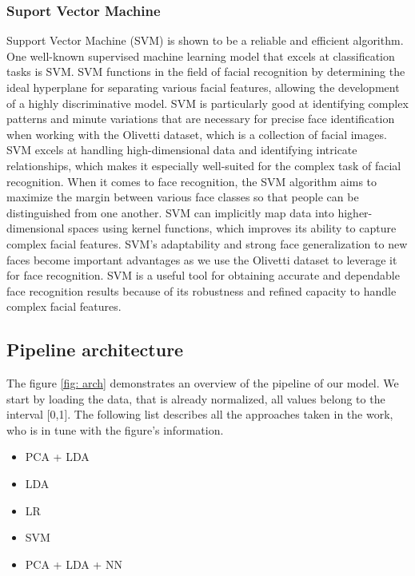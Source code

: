 \documentclass[12pt,a4paper,twocolumn]{article}
\begin{document}
\subsubsection{Suport Vector Machine}
Support Vector Machine (SVM) is shown to be a reliable and efficient algorithm. One well-known supervised machine learning model that excels at classification tasks is SVM. SVM functions in the field of facial recognition by determining the ideal hyperplane for separating various facial features, allowing the development of a highly discriminative model. SVM is particularly good at identifying complex patterns and minute variations that are necessary for precise face identification when working with the Olivetti dataset, which is a collection of facial images. SVM excels at handling high-dimensional data and identifying intricate relationships, which makes it especially well-suited for the complex task of facial recognition. When it comes to face recognition, the SVM algorithm aims to maximize the margin between various face classes so that people can be distinguished from one another. SVM can implicitly map data into higher-dimensional spaces using kernel functions, which improves its ability to capture complex facial features. SVM's adaptability and strong face generalization to new faces become important advantages as we use the Olivetti dataset to leverage it for face recognition. SVM is a useful tool for obtaining accurate and dependable face recognition results because of its robustness and refined capacity to handle complex facial features.


\subsection{Pipeline architecture}

\par The figure \ref{fig: arch} demonstrates an overview of the pipeline of our model. We start by loading the data, that is already normalized, all values belong to the interval [0,1].
The following list describes all the approaches taken in the work, who is in tune with the figure's information. 
\begin{itemize}
  \item PCA + LDA
  \item LDA
  \item LR
  \item SVM
  \item PCA + LDA + NN

\end{itemize}
\end{document}
